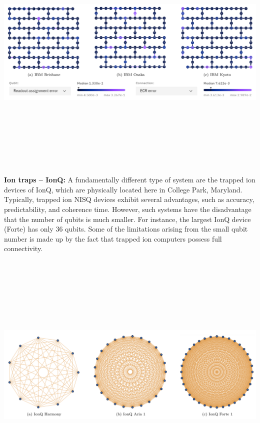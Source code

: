 \documentclass[portrait,a0b,final]{a0poster}
\newenvironment{poster}{
  \begin{center}
  \begin{minipage}[c]{0.98\textwidth}
}{
  \end{minipage} 
  \end{center}
}
\newenvironment{pcolumn}[1]{
  \begin{minipage}{#1\textwidth}
  \begin{center}
}{
  \end{center}
  \end{minipage}
}
\begin{document}
\begin{poster}
\begin{center}
\begin{pcolumn}{0.495}
{\begin{center}
  \includegraphics[height=12cm,angle=0]{ibmDevices.png}
\end{center}

\textbf{Ion traps -- IonQ:}
A fundamentally different type of system are the trapped ion devices of IonQ, which are physically located here in College Park, Maryland.
Typically, trapped ion NISQ devices exhibit several advantages, such as accuracy, predictability, and coherence time.
However, such systems have the disadvantage that the number of qubits is much smaller.
For instance, the largest IonQ device (Forte) has only 36 qubits.
Some of the limitations arising from the small qubit number is made up by the fact that trapped ion computers possess full connectivity.

\begin{center}
  \includegraphics[height=12cm,angle=0]{ionqDevices.png}
\end{center}

}
\end{pcolumn}
\end{center}
\end{poster}
\end{document}
